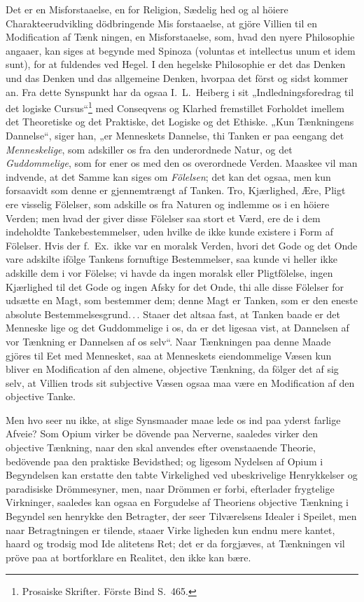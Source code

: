 \documentclass[12pt,a4paper]{article}
\newcommand{\opage}[1]{\marginnote{\footnotesize\textit{[#1]}}}
\begin{document}
Det er en Misforstaaelse, en for Religion, Sædelig\-%
hed og al höiere Charakteerudvikling dödbringende Mis\-%
forstaaelse, at gjöre Villien til en Modification af Tænk\-%
ningen, en Misforstaaelse, som, hvad den nyere Philosophie
angaaer, kan siges at begynde med Spinoza (voluntas
et intellectus unum et idem sunt), for at fuldendes ved
Hegel. I den hegelske Philosophie er det das Denken
und das Denken und das allgemeine Denken, hvorpaa
det först og sidst kommer an. Fra dette Synspunkt har
da ogsaa I.\ L.\ Heiberg i sit „Indledningsforedrag til det
logiske Cursus“\footnote{%
Prosaiske Skrifter. Förste Bind S.~465.}
med Conseqvens og Klarhed fremstillet
Forholdet imellem det Theoretiske og det Praktiske,
det Logiske og det Ethiske. „Kun Tænkningens Dannelse“,
siger han, „er Menneskets Dannelse, thi Tanken er paa
eengang det \emph{Menneskelige}, som adskiller os fra den
underordnede Natur, og det \emph{Guddommelige}, som for\-%
ener os med den os overordnede Verden. Maaskee vil
man indvende, at det Samme kan siges om \emph{Fölelsen};
det kan det ogsaa, men kun forsaavidt som denne er
gjennemtrængt af Tanken. Tro, Kjærlighed, Ære, Pligt
ere visselig Fölelser, som adskille os fra Naturen og
indlemme os i en höiere Verden; men hvad der giver
disse Fölelser saa stort et Værd, ere de i dem indeholdte
Tankebestemmelser, uden hvilke de ikke kunde existere
i Form af Fölelser. Hvis der f.\ Ex.\ ikke var en moralsk
Verden, hvori det Gode og det Onde vare adskilte ifölge
Tankens fornuftige Bestemmelser, saa kunde vi heller
ikke adskille dem i vor Fölelse; vi havde da ingen
\opage{68}moralsk eller Pligtfölelse, ingen Kjærlighed til det Gode
og ingen Afsky for det Onde, thi alle disse Fölelser for\-%
udsætte en Magt, som bestemmer dem; denne Magt er
Tanken, som er den eneste absolute Bestemmelsesgrund.\,.\,.
Staaer det altsaa fast, at Tanken baade er det Menneske\-%
lige og det Guddommelige i os, da er det ligesaa vist,
at Dannelsen af vor Tænkning er Dannelsen af os selv“.
Naar Tænkningen paa denne Maade gjöres til Eet med
Mennesket, saa at Menneskets eiendommelige Væsen kun
bliver en Modification af den almene, objective Tænkning,
da fölger det af sig selv, at Villien trods sit subjective
Væsen ogsaa maa være en Modification af den objective
Tanke.

Men hvo seer nu ikke, at slige Synsmaader maae lede
os ind paa yderst farlige Afveie? Som Opium virker be\-%
dövende paa Nerverne, saaledes virker den objective
Tænkning, naar den skal anvendes efter ovenstaaende
Theorie, bedövende paa den praktiske Bevidsthed; og
ligesom Nydelsen af Opium i Begyndelsen kan erstatte
den tabte Virkelighed ved ubeskrivelige Henrykkelser og
paradisiske Drömmesyner, men, naar Drömmen er forbi,
efterlader frygtelige Virkninger, saaledes kan ogsaa en
Forgudelse af Theoriens objective Tænkning i Begyndel\-%
sen henrykke den Betragter, der seer Tilværelsens Idealer
i Speilet, men naar Betragtningen er tilende, staaer Virke\-%
ligheden kun endnu mere kantet, haard og trodsig mod Ide\-%
alitetens Ret; det er da forgjæves, at Tænkningen vil pröve
paa at bortforklare en Realitet, den ikke kan bære.
\end{document}
